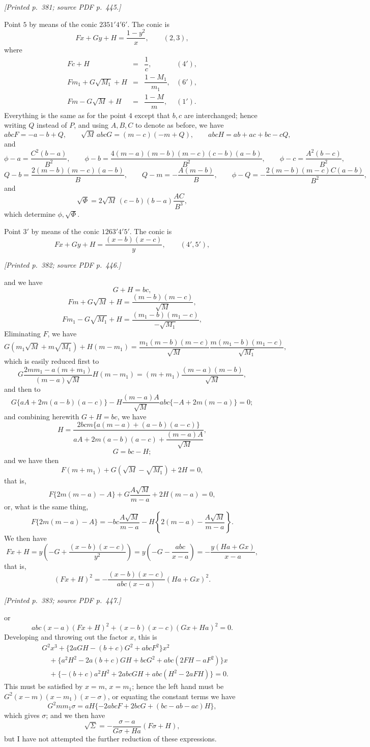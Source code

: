 \documentclass[11pt,a4paper]{article}
\newcommand{\sourcepage}[2]{\par\smallskip\noindent\textit{[Printed p.~#1; source PDF p.~#2.]}\par\smallskip}
\begin{document}
\sourcepage{381}{445}
Point $5$ by means of the conic $2351'4'6'$. The conic is
\[
Fx+Gy+H=\frac{1-y^2}{x},\qquad (2,3),
\]
where
\[
\begin{array}{rcll}
Fc+H&=&\dfrac1c, &(4'),\\[1mm]
Fm_1+G\sqrt{M_1}+H&=&\dfrac{1-M_1}{m_1}, &(6'),\\[1mm]
Fm-G\sqrt M+H&=&\dfrac{1-M}{m}, &(1').
\end{array}
\]
Everything is the same as for the point $4$ except that $b,c$ are interchanged;
hence writing $Q$ instead of $P$, and using $A,B,C$ to denote as before, we have
\[
abcF=-a-b+Q,\qquad
\sqrt M\,abcG=(m-c)(-m+Q),\qquad
abcH=ab+ac+bc-cQ,
\]
and
\[
\phi-a=\frac{C^2(b-a)}{B^2},\qquad
\phi-b=\frac{4(m-a)(m-b)(m-c)(c-b)(a-b)}{B^2},\qquad
\phi-c=\frac{A^2(b-c)}{B^2},
\]
\[
Q-b=\frac{2(m-b)(m-c)(a-b)}{B},\qquad
Q-m=-\frac{A(m-b)}{B},\qquad
\phi-Q=-\frac{2(m-b)(m-c)C(a-b)}{B^2},
\]
and
\[
\sqrt\Phi=2\sqrt M\,(c-b)(b-a)\frac{AC}{B^3},
\]
which determine $\phi,\sqrt\Phi$.

Point $3'$ by means of the conic $1263'4'5'$. The conic is
\[
Fx+Gy+H=\frac{(x-b)(x-c)}{y},\qquad (4',5'),
\]

\sourcepage{382}{446}
\noindent
and we have
\[
G+H=bc,\tag{2}
\]
\[
Fm+G\sqrt M+H=\frac{(m-b)(m-c)}{\sqrt M},\tag{1}
\]
\[
Fm_1-G\sqrt{M_1}+H=\frac{(m_1-b)(m_1-c)}{-\sqrt{M_1}},\tag{6}
\]
Eliminating $F$, we have
\[
G(m_1\sqrt M+m\sqrt{M_1})+H(m-m_1)
=\frac{m_1(m-b)(m-c)}{\sqrt M}
\frac{m(m_1-b)(m_1-c)}{\sqrt{M_1}},
\]
which is easily reduced first to
\[
G\frac{2mm_1-a(m+m_1)}{(m-a)\sqrt M}
H(m-m_1)=(m+m_1)\frac{(m-a)(m-b)}{\sqrt M},
\]
and then to
\[
G\{aA+2m(a-b)(a-c)\}
-H\frac{(m-a)A}{\sqrt M}
abc\{-A+2m(m-a)\}=0;
\]
and combining herewith $G+H=bc$, we have
\[
H=\frac{2bcm\{a(m-a)+(a-b)(a-c)\}}
{aA+2m(a-b)(a-c)+\dfrac{(m-a)A}{\sqrt M}},
\]
\[
G=bc-H;
\]
and we have then
\[
F(m+m_1)+G(\sqrt M-\sqrt{M_1})+2H=0,
\]
that is,
\[
F\{2m(m-a)-A\}+G\frac{A\sqrt M}{m-a}+2H(m-a)=0,
\]
or, what is the same thing,
\[
F\{2m(m-a)-A\}=-bc\frac{A\sqrt M}{m-a}
-H\left\{2(m-a)-\frac{A\sqrt M}{m-a}\right\}.
\]
We then have
\[
Fx+H=y\left(-G+\frac{(x-b)(x-c)}{y^2}\right)
=y\left(-G-\frac{abc}{x-a}\right)
=-\frac{y(Ha+Gx)}{x-a},
\]
that is,
\[
(Fx+H)^2=-\frac{(x-b)(x-c)}{abc(x-a)}(Ha+Gx)^2.
\]

\sourcepage{383}{447}
or
\[
abc(x-a)(Fx+H)^2+(x-b)(x-c)(Gx+Ha)^2=0.
\]
Developing and throwing out the factor $x$, this is
\[
\begin{aligned}
&G^2x^3+\{2aGH-(b+c)G^2+abcF^2\}x^2\\
&\quad+\{a^2H^2-2a(b+c)GH+bcG^2+abc(2FH-aF^2)\}x\\
&\quad+\{-(b+c)a^2H^2+2abcGH+abc(H^2-2aFH)\}=0.
\end{aligned}
\]
This must be satisfied by $x=m$, $x=m_1$; hence the left hand must be
$G^2(x-m)(x-m_1)(x-\sigma)$, or equating the constant terms we have
\[
G^2mm_1\sigma
=aH\{-2abcF+2bcG+(bc-ab-ac)H\},
\]
which gives $\sigma$; and we then have
\[
\sqrt\Sigma=-\frac{\sigma-a}{G\sigma+Ha}(F\sigma+H),
\]
but I have not attempted the further reduction of these expressions.
\end{document}
